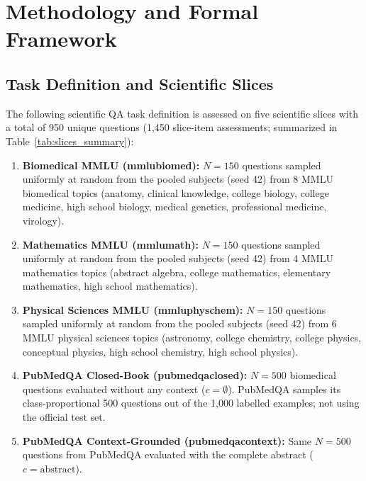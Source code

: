 \documentclass[sigconf,nonacm]{acmart}
\makeatletter
\DeclareRobustCommand{\_}{\ifmmode\nfss@text{\textunderscore}\else\textunderscore\allowbreak\fi}
\makeatother
\begin{document}
\section{Methodology and Formal Framework}
\subsection{Task Definition and Scientific Slices}
The following scientific QA task definition is assessed on five scientific slices with a total of 950 unique questions (1,450 slice-item assessments; summarized in Table~\ref{tab:slices_summary}):
\begin{enumerate}
    \item \textbf{Biomedical MMLU (\textsf{mmlu\_biomed}):} $N=150$ questions sampled uniformly at random from the pooled subjects (seed 42) from 8 MMLU biomedical topics (anatomy, clinical knowledge, college biology, college medicine, high school biology, medical genetics, professional medicine, virology).
    \item \textbf{Mathematics MMLU (\textsf{mmlu\_math}):} $N=150$ questions sampled uniformly at random from the pooled subjects (seed 42) from 4 MMLU mathematics topics (abstract algebra, college mathematics, elementary mathematics, high school mathematics).
    \item \textbf{Physical Sciences MMLU (\textsf{mmlu\_physchem}):} $N=150$ questions sampled uniformly at random from the pooled subjects (seed 42) from 6 MMLU physical sciences topics (astronomy, college chemistry, college physics, conceptual physics, high school chemistry, high school physics).
    \item \textbf{PubMedQA Closed-Book (\textsf{pubmedqa\_closed}):} $N=500$ biomedical questions evaluated without any context ($c = \emptyset$). PubMedQA samples its class-proportional 500 questions out of the 1,000 labelled examples; not using the official test set.
    \item \textbf{PubMedQA Context-Grounded (\textsf{pubmedqa\_context}):} Same $N=500$ questions from PubMedQA evaluated with the complete abstract ($c = \text{abstract}$).
\end{enumerate}
\end{document}
